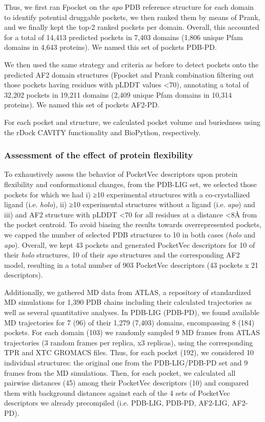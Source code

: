 Thus, we first ran Fpocket on the \textit{apo} PDB reference structure for each domain to identify potential druggable pockets, we then ranked them by means of Prank, and we finally kept the top-2 ranked pockets per domain. Overall, this accounted for a total of 14,413 predicted pockets in 7,403 domains (1,806 unique Pfam domains in 4,643 proteins). We named this set of pockets PDB-PD.

We then used the same strategy and criteria as before to detect pockets onto the predicted AF2 domain structures (Fpocket and Prank combination filtering out those pockets having residues with pLDDT values <70), annotating a total of 32,202 pockets in 19,211 domains (2,409 unique Pfam domains in 10,314 proteins). We named this set of pockets AF2-PD.

For each pocket and structure, we calculated pocket volume and buriedness using the rDock CAVITY functionality\cite{ruiz-carmona_rdock_2014} and BioPython\cite{cock_biopython_2009}, respectively.

\subsubsection{Assessment of the effect of protein flexibility}

To exhaustively assess the behavior of PocketVec descriptors upon protein flexibility and conformational changes, from the PDB-LIG set, we selected those pockets for which we had i) ≥10 experimental structures with a co-crystallized ligand (i.e. \textit{holo}), ii) ≥10 experimental structures without a ligand (i.e. \textit{apo}) and iii) and AF2 structure with pLDDT <70 for all residues at a distance <8Å from the pocket centroid. To avoid biasing the results towards overrepresented pockets, we capped the number of selected PDB structures to 10 in both cases (\textit{holo} and \textit{apo}). Overall, we kept 43 pockets and generated PocketVec descriptors for 10 of their \textit{holo} structures, 10 of their \textit{apo} structures and the corresponding AF2 model, resulting in a total number of 903 PocketVec descriptors (43 pockets x 21 descriptors).

Additionally, we gathered MD data from ATLAS\cite{vandermeersche_atlas_2024}, a repository of standardized MD simulations for 1,390 PDB chains including their calculated trajectories as well as several quantitative analyses. In PDB-LIG (PDB-PD), we found available MD trajectories for 7 (96) of their 1,279 (7,403) domains, encompassing 8 (184) pockets. For each domain (103) we randomly sampled 9 MD frames from ATLAS trajectories (3 random frames per replica, x3 replicas), using the corresponding TPR and XTC GROMACS files. Thus, for each pocket (192), we considered 10 individual structures: the original one from the PDB-LIG/PDB-PD set and 9 frames from the MD simulations. Then, for each pocket, we calculated all pairwise distances (45) among their PocketVec descriptors (10) and compared them with background distances against each of the 4 sets of PocketVec descriptors we already precompiled (i.e. PDB-LIG, PDB-PD, AF2-LIG, AF2-PD).

